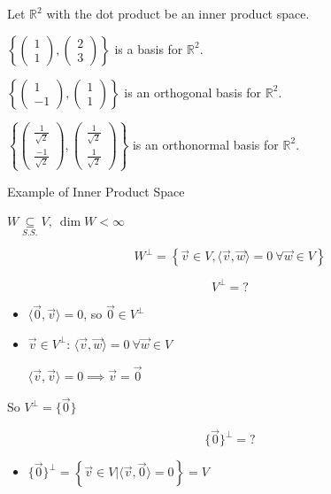 \documentclass[11pt,fleqn]{book} %
\begin{document}
\begin{example}
    Let $\mathbb{R}^2$ with the dot product be an inner product space. 

    $\left\{ \begin{pmatrix} 1 \\ 1 \end{pmatrix}, \begin{pmatrix} 2 \\ 3 \end{pmatrix} \right\}$ is a basis for $\mathbb{R}^2$. 

    $\left\{ \begin{pmatrix} 1 \\ -1 \end{pmatrix}, \begin{pmatrix} 1 \\ 1 \end{pmatrix} \right\}$ is an orthogonal basis for $\mathbb{R}^2$. 

    $\left\{ \begin{pmatrix} \frac{1}{\sqrt{2}} \\ \frac{-1}{\sqrt{2}} \end{pmatrix}, \begin{pmatrix} \frac{1}{\sqrt{2}} \\ \frac{1}{\sqrt{2}} \end{pmatrix} \right\}$ is an orthonormal basis for $\mathbb{R}^2$. 
\end{example}

\begin{example}
    Example of Inner Product Space

    $W \underset{S.S.}{\subseteq}V,~ \dim W < \infty$

    $$W^\perp = \left\{ \overrightarrow{v} \in V , \langle \overrightarrow{v}, \overrightarrow{w} \rangle = 0 ~ \forall \overrightarrow{w} \in V \right\}$$

    $$V^\perp = ?$$
    
    \begin{itemize}
        \item $\langle \overrightarrow{0}, \overrightarrow{v} \rangle = 0$, so $\overrightarrow{0} \in V^\perp$

        \item $\overrightarrow{v} \in V^\perp$: $\langle \overrightarrow{v}, \overrightarrow{w} \rangle = 0 ~ \forall \overrightarrow{w} \in V$
        
        $\langle \overrightarrow{v}, \overrightarrow{v} \rangle = 0 \implies \overrightarrow{v} = \overrightarrow{0}$
    \end{itemize}
    
    So $V^\perp = \{ \overrightarrow{0} \}$

    $$\{ \overrightarrow{0} \}^\perp = ?$$
    
    \begin{itemize}
        \item $\{ \overrightarrow{0} \}^\perp = \left\{ \overrightarrow{v} \in V \big| \langle \overrightarrow{v}, \overrightarrow{0} \rangle = 0 \right\} = V$
    \end{itemize}
\end{example}
\end{document}
